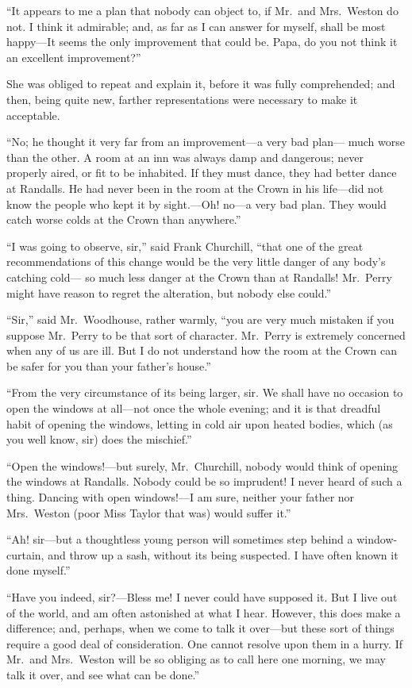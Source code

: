 ``It appears to me a plan that nobody can object to, if Mr.\ and
Mrs.\ Weston do not.  I think it admirable; and, as far as I can
answer for myself, shall be most happy---It seems the only improvement
that could be.  Papa, do you not think it an excellent improvement?''

She was obliged to repeat and explain it, before it was fully
comprehended; and then, being quite new, farther representations
were necessary to make it acceptable.

``No; he thought it very far from an improvement---a very bad plan---%
much worse than the other.  A room at an inn was always damp
and dangerous; never properly aired, or fit to be inhabited.
If they must dance, they had better dance at Randalls.  He had never
been in the room at the Crown in his life---did not know the people
who kept it by sight.---Oh! no---a very bad plan.  They would catch
worse colds at the Crown than anywhere.''

``I was going to observe, sir,'' said Frank Churchill,
``that one of the great recommendations of this change would
be the very little danger of any body's catching cold---%
so much less danger at the Crown than at Randalls!  Mr.\ Perry
might have reason to regret the alteration, but nobody else could.''

``Sir,'' said Mr.\ Woodhouse, rather warmly, ``you are very much
mistaken if you suppose Mr.\ Perry to be that sort of character.
Mr.\ Perry is extremely concerned when any of us are ill.  But I
do not understand how the room at the Crown can be safer for you
than your father's house.''

``From the very circumstance of its being larger, sir.  We shall have
no occasion to open the windows at all---not once the whole evening;
and it is that dreadful habit of opening the windows, letting in cold
air upon heated bodies, which (as you well know, sir) does the mischief.''

``Open the windows!---but surely, Mr.\ Churchill, nobody would think
of opening the windows at Randalls.  Nobody could be so imprudent!
I never heard of such a thing.  Dancing with open windows!---I am sure,
neither your father nor Mrs.\ Weston (poor Miss Taylor that was)
would suffer it.''

``Ah! sir---but a thoughtless young person will sometimes step behind
a window-curtain, and throw up a sash, without its being suspected.
I have often known it done myself.''

``Have you indeed, sir?---Bless me!  I never could have supposed it.
But I live out of the world, and am often astonished at what I hear.
However, this does make a difference; and, perhaps, when we come
to talk it over---but these sort of things require a good deal
of consideration.  One cannot resolve upon them in a hurry.
If Mr.\ and Mrs.\ Weston will be so obliging as to call here one morning,
we may talk it over, and see what can be done.''


